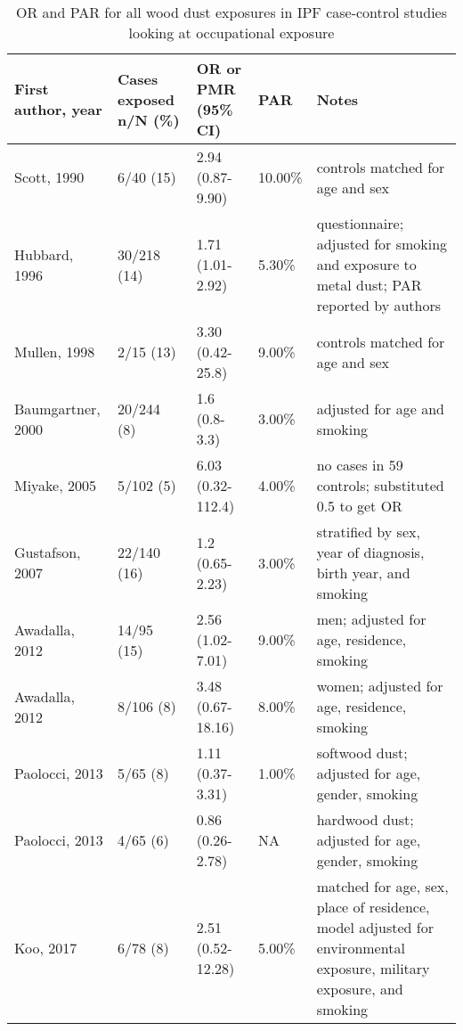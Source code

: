 \documentclass[a4
er,12pt]{article}
\begin{document}
\begin{table}   
     \begin{tabular}{p{3.5cm}p{3cm}p{2cm}p{2cm}p{3.5cm}}
     \textbf{First author, year} & \textbf{Cases exposed n/N (\%)} & \textbf{OR or PMR (95\% CI)} & \textbf{PAR} &   \textbf{Notes} \\
     \midrule
  Scott, 1990 &  6/40 (15) &  2.94 (0.87-9.90) &  10.00\% &  controls matched for age and sex \\
 Hubbard, 1996 &  30/218 (14) &  1.71 (1.01-2.92) &  5.30\% &  questionnaire; adjusted for smoking and exposure to metal dust; PAR reported by authors \\
 Mullen, 1998 &  2/15 (13) &  3.30 (0.42-25.8) &  9.00\% &  controls matched for age and sex \\
 Baumgartner, 2000 &  20/244 (8) &  1.6 (0.8-3.3) &  3.00\% &  adjusted for age and smoking \\
 Miyake, 2005 &  5/102 (5) &  6.03 (0.32- 112.4)  &  4.00\% &  no cases in 59 controls; substituted 0.5 to get OR \\
 Gustafson, 2007 &  22/140 (16) &  1.2 (0.65-2.23) &  3.00\% &  stratified by sex, year of diagnosis, birth year, and smoking \\
 Awadalla, 2012 &  14/95 (15) &  2.56 (1.02-7.01) &  9.00\% &  men; adjusted for age, residence, smoking \\
 Awadalla, 2012 &  8/106 (8) &  3.48 (0.67-18.16) &  8.00\% &  women; adjusted for age, residence, smoking \\
 Paolocci, 2013 &  5/65 (8) &  1.11 (0.37-3.31) &  1.00\% &  softwood dust; adjusted for age, gender, smoking \\
 Paolocci, 2013 &  4/65 (6) &  0.86 (0.26-2.78) &  NA &  hardwood dust; adjusted for age, gender, smoking \\
 Koo, 2017 &  6/78 (8) &  2.51 (0.52-12.28) &  5.00\% &  matched for age, sex, place of residence, model adjusted for environmental exposure, military exposure, and smoking \\
     \end{tabular}                 
     \caption{OR and PAR for all wood dust exposures in IPF case-control studies looking at occupational exposure}
     \label{table:ipfwooddust}
 \end{table}
\end{document}
